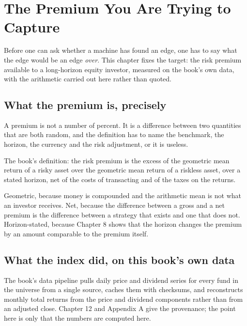 
\chapter{The Premium You Are Trying to Capture}
\label{ch:premium}

Before one can ask whether a machine has found an edge, one has to say what
the edge would be an edge \emph{over}. This chapter fixes the target: the
risk premium available to a long-horizon equity investor, measured on the
book's own data, with the arithmetic carried out here rather than quoted.

\section{What the premium is, precisely}

A premium is not a number of percent. It is a difference between two
quantities that are both random, and the definition has to name the
benchmark, the horizon, the currency and the risk adjustment, or it is
useless.

The book's definition: the risk premium is the excess of the geometric mean
return of a risky asset over the geometric mean return of a riskless asset,
over a stated horizon, net of the costs of transacting and of the taxes on
the returns.

Geometric, because money is compounded and the arithmetic mean is not what
an investor receives. Net, because the difference between a gross and a net
premium is the difference between a strategy that exists and one that does
not. Horizon-stated, because Chapter 8 shows that the horizon changes the
premium by an amount comparable to the premium itself.

\section{What the index did, on this book's own data}

The book's data pipeline pulls daily price and dividend series for every
fund in the universe from a single source, caches them with checksums, and
reconstructs monthly total returns from the price and dividend components
rather than from an adjusted close. Chapter 12 and Appendix A give the
provenance; the point here is only that the numbers are computed here.

